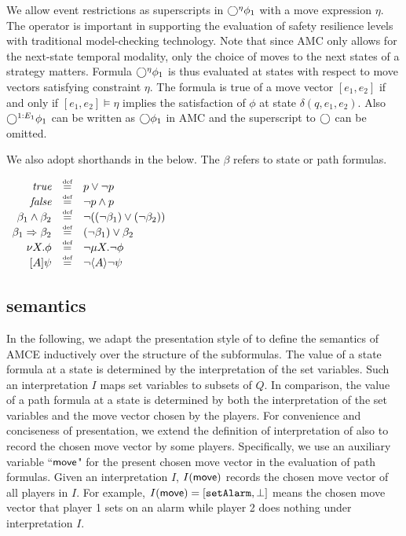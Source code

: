 We allow event 
restrictions as superscripts in $\bigcirc^\eta\phi_1$ 
with a move expression $\eta$.  
The operator is important in supporting the evaluation of safety resilience levels with traditional model-checking technology.  
Note that since AMC \cite{AHK02} only allows for the next-state temporal 
modality, 
only the choice of moves to the next states of a strategy matters.  
Formula $\bigcirc^\eta\phi_1$ is thus evaluated at states  
with respect to move vectors satisfying constraint $\eta$.  
The formula is true of a move vector $[e_1,e_2]$ if and only if 
$[e_1,e_2]\models \eta$  
implies the satisfaction of $\phi$ at state $\delta(q,e_1,e_2)$. 
Also 
$\bigcirc^{1:E_1}\phi_1$ can be written as $\bigcirc\phi_1$ in AMC \cite{AHK02} 
and 
the superscript to $\bigcirc$ can be omitted.    



We also adopt shorthands in the below.  
The $\beta$ refers to state or path formulas.
\begin{center} 
$\begin{array}{rcl}
\true	& \defn & p \vee \neg p \\
\false	& \defn	& \neg p \wedge p \\ 

\beta_1 \wedge \beta_2 & \defn & \neg((\neg \beta_1) \vee (\neg \beta_2)) \\ 
\beta_1 \Rightarrow \beta_2 & \defn & (\neg \beta_1) \vee \beta_2 \\

\nu X.\phi & \defn & \neg \mu X.\neg\phi \\ 

{[A]\psi} & \defn & \neg \langle A\rangle \neg\psi \\ 
\end{array}$
\end{center} 

\subsection{semantics}
In the following, we adapt the presentation style of \cite{AHK02} 
to define the semantics of AMCE inductively over the structure of the subformulas.  
The value of a state formula at a state \label{reply1.semantics.dont.understand} 
is determined by the interpretation of the set variables.  
Such an interpretation $I$ maps set variables to subsets of $Q$.  
In comparison, the value of a path formula at a state 
is determined by both the interpretation
of the set variables and the move vector chosen by the players. 
For convenience and conciseness of presentation, 
we extend the definition of interpretation of \cite{AHK02} also to 
record the chosen move vector by some players. 
Specifically, we use an auxiliary variable ``$\sf move$"  
for the present chosen move vector in the evaluation of path formulas. 
Given an interpretation $I$, $I(\sf move)$ records the chosen move vector  
of all players in $I$.  
For example, $I(\sf move)=[\text{\tt setAlarm},\perp]$ 
means the chosen move vector 
that player 1 sets on an alarm while player 2 does nothing under interpretation $I$. 

